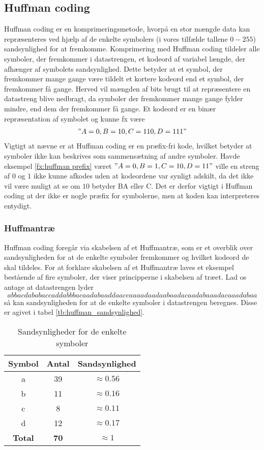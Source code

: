 \subsection{Huffman coding}
\label{sec:huffmanteori}
Huffman coding er en komprimeringsmetode, hvorpå en stor mængde data kan repræsenteres ved hjælp af de enkelte symbolers (i vores tilfælde tallene $0-255$) sandsynlighed for at fremkomme. Komprimering med Huffman coding tildeler alle symboler, der fremkommer i datastrengen, et kodeord af variabel længde, der afhænger af symbolets sandsynlighed. Dette betyder at et symbol, der fremkommer mange gange være tildelt et kortere kodeord end et symbol, der fremkommer få gange. Herved vil mængden af bits brugt til at repræsentere en datastreng blive nedbragt, da symboler der fremkommer mange gange fylder mindre, end dem der fremkommer få gange. Et kodeord er en binær repræsentation af symbolet og kunne fx være
\begin{align}
"A=0, B=10, C=110, D=111"
\label{fx:huffman prefix}
\end{align}
Vigtigt at nævne er at Huffman coding er en præfix-fri kode, hvilket betyder at symboler ikke kan beskrives som sammensætning af andre symboler. Havde eksempel \vref{fx:huffman prefix} været $"A=0, B=1, C=10, D=11"$ ville en streng af $0$ og $1$ ikke kunne afkodes uden at kodeordene var synligt adskilt, da det ikke vil være muligt at se om $10$ betyder BA eller C. Det er derfor vigtigt i Huffman coding at der ikke er nogle præfix for symbolerne, men at koden kan interpreteres entydigt.

\subsubsection{Huffmantræ}
Huffman coding foregår via skabelsen af et Huffmantræ, som er et overblik over sandsynligheden for at de enkelte symboler fremkommer og hvilket kodeord de skal tildeles. For at forklare skabelsen af et Huffmantræ laves et eksempel bestående af fire symboler, der viser principperne i skabelsen af træet.
Lad os antage at datastrengen lyder $$ abbacdababaccaddabbbacaadabaaddaaccaaaadaadaabaadacaadabaaadacaaadabaa
 $$ så kan sandsynligheden for at de enkelte symboler i datastrengen beregnes. Disse er agivet i tabel \vref{tb:huffman_sandsynlighed}.
\begin{table}[!h]
\centering
\begin{tabular}{|c|c|c|} 
\hline
\textbf{Symbol}	&	\textbf{Antal}	&	\textbf{Sandsynlighed}			\\ \hline
a		&	39		&	$\approx  0.56$	\\ \hline
b		&	11		&	$\approx  0.16$	\\ \hline
c		&	8		&	$\approx  0.11$	\\ \hline
d		&	12		&	$\approx  0.17$	\\ \hline
\textbf{Total}	&	\textbf{70}		&	\textbf{$\approx 1$}				\\ \hline
\end{tabular}
\caption{Sandsynligheder for de enkelte symboler}
\label{tb:huffman_sandsynlighed}
\end{table}

